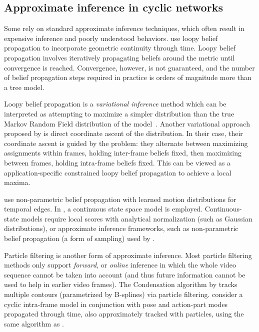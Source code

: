 \subsection{Approximate inference in cyclic networks}
Some rely on standard approximate inference techniques, which often result in 
expensive inference and poorly understood behaviors.  \citet{ferrari08} use 
loopy belief propagation to incorporate geometric continuity through time.  
Loopy belief propagation involves iteratively propagating beliefs around the 
metric until convergence is reached.  Convergence, however, is not guaranteed, 
and the number of belief propagation steps required in practice is orders of 
magnitude more than a tree model.  

Loopy belief propagation is a {\em variational inference} method which can be 
interpreted as attempting to maximize a simpler distribution than the true 
Markov Random Field distribution of the model~\citep{jaakkola2000}.  Another 
variational approach proposed by \citet{ioffe2001} is direct coordinate ascent 
of the distribution.  In their case, their coordinate ascent is guided by the 
problem: they alternate between maximizing assignments within frames, holding 
inter-frame beliefs fixed, then maximizing between frames, holding intra-frame 
beliefs fixed.  This can be viewed as a application-specific constrained loopy 
belief propagation to achieve a local maxima.

\citet{sigal2004tracking} use non-parametric belief propagation with learned 
motion distributions for temporal edges. In \citet{sigal2004measure}, a 
continuous state space model is employed.  Continuous-state models require 
local scores with analytical normalization (such as Gaussian distributions), or 
approximate inference frameworks, such as non-parametric belief propagation (a 
form of sampling) used by \citet{sigal2004measure}.

Particle filtering is another form of approximate inference.  Most particle 
filtering methods only support {\em forward}, or {\em online} inference in 
which the whole video sequence cannot be taken into account (and thus future 
information cannot be used to help in earlier video frames).  The Condensation 
algorithm by \citet{isard98} tracks multiple contours (parametrized by 
B-splines) via particle filtering.  \citet{nevatia2011} consider a cyclic 
intra-frame model in conjunction with pose and action-part modes propagated 
through time, also approximately tracked with particles, using the same 
algorithm as \citet{sigal2004measure}.

